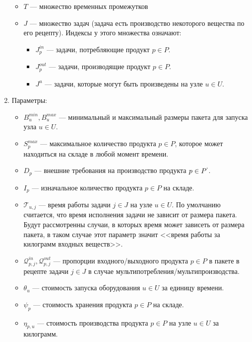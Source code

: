 \documentclass[12pt, twoside]{article}
\theoremstyle{definition}
\newcommand{\Tau}{\mathcal{T}}
\begin{document}
\begin{enumerate}
\begin{itemize}
     \item $T$ --- множество временных промежутков
     \item $J$ --- множество задач (задача есть производство некоторого вещества по его рецепту). Индексы у этого множества означают:
     \begin{itemize}
     		\item $J^{in}_p$ --- задачи, потребляющие продукт $p \in P$.
     		\item $J^{out}_p$ --- задачи, производящие продукт $p \in P$.
     		\item $J^{u}$ --- задачи, которые могут быть произведены на узле $u \in U$.
     \end{itemize}
   \end{itemize}
   \item Параметры:
   	\begin{itemize}
   		\item $B^{min}_u, B^{max}_u$ --- минимальный и максимальный размеры пакета для запуска узла $u \in U$.
   		\item $S^{max}_p$ --- максимальное количество продукта $p \in P$, которое может находиться на складе в любой момент времени.
   		\item $D_p$ --- внешние требования на производство продукта $p \in P^{`}$.
   		\item $I_p$ --- изначальное количество продукта $p \in P$ на складе.
   		\item $\Tau_{u, j}$ --- время работы задачи $j \in J$ на узле $u \in U$. По умолчанию считается, что время исполнения задачи не зависит от размера пакета. Будут рассмотренны случаи, в которых время может зависеть от размера пакета, в таком случае этот параметр значит <<время работы за килограмм входных веществ>>.
   		\item $\mathcal{Q}^{in}_{p, j}, \mathcal{Q}^{out}_{p, j}$ --- пропорции входного/выходного продукта $p \in P$ в пакете в рецепте задачи $j \in J$ в случае мультипотребления/мультипроизводства.
   		\item $\theta_{u}$ --- стоимость запуска оборудования $u \in U$ за единицу времени.
   		\item $\psi_{p}$ --- стоимость хранения продукта $p \in P$ на складе.
   		\item $\eta_{p, u}$ --- стоимость производства продукта $p \in P$ на узле $u \in U$ за килограмм.
   	\end{itemize}
\end{enumerate}
\end{document}
